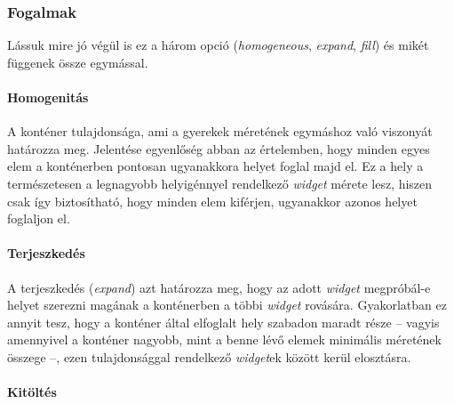 \subsubsection{Fogalmak}

Lássuk mire jó végül is ez a három opció (\textit{homogeneous}, \textit{expand}, \textit{fill}) és mikét függenek össze egymással.

\paragraph{Homogenitás}

A konténer tulajdonsága, ami a gyerekek méretének egymáshoz való viszonyát határozza meg. Jelentése egyenlőség abban az értelemben, hogy minden egyes elem a konténerben pontosan ugyanakkora helyet foglal majd el. Ez a hely a természetesen a legnagyobb helyigénnyel rendelkező \textit{widget} mérete lesz, hiszen csak így biztosítható, hogy minden elem kiférjen, ugyanakkor azonos helyet foglaljon el.

\paragraph{Terjeszkedés}

A terjeszkedés (\textit{expand}) azt határozza meg, hogy az adott \textit{widget} megpróbál-e helyet szerezni magának a konténerben a többi \textit{widget} rovására. Gyakorlatban ez annyit tesz, hogy a konténer által elfoglalt hely szabadon maradt része -- vagyis amennyivel a konténer nagyobb, mint a benne lévő elemek minimális méretének összege --, ezen tulajdonsággal rendelkező \textit{widget}ek között kerül elosztásra.

\paragraph{Kitöltés}

